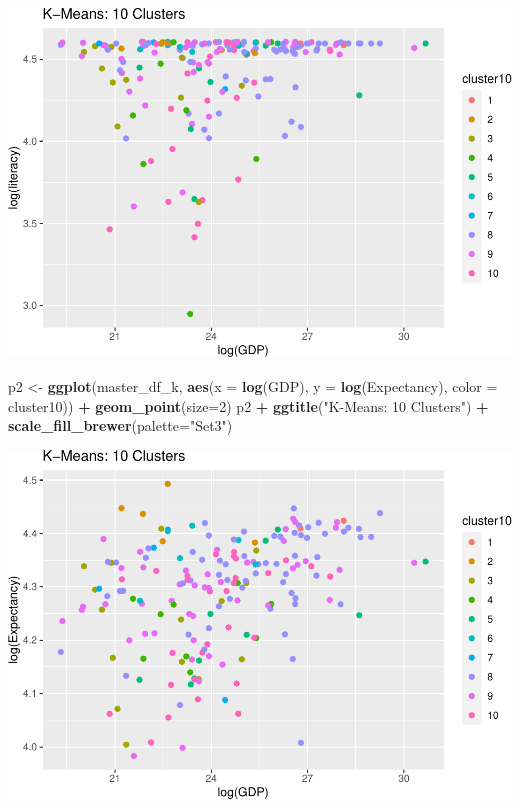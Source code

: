 \documentclass[]{article}
\newenvironment{Shaded}{\begin{snugshade}}{\end{snugshade}}
\newcommand{\DataTypeTok}[1]{\textcolor[rgb]{0.13,0.29,0.53}{#1}}
\newcommand{\DecValTok}[1]{\textcolor[rgb]{0.00,0.00,0.81}{#1}}
\newcommand{\KeywordTok}[1]{\textcolor[rgb]{0.13,0.29,0.53}{\textbf{#1}}}
\newcommand{\NormalTok}[1]{#1}
\newcommand{\OperatorTok}[1]{\textcolor[rgb]{0.81,0.36,0.00}{\textbf{#1}}}
\newcommand{\StringTok}[1]{\textcolor[rgb]{0.31,0.60,0.02}{#1}}
\begin{document}
\includegraphics{eda_files/figure-latex/unnamed-chunk-29-4.pdf}

\begin{Shaded}
\begin{Highlighting}[]
\NormalTok{p2 <-}\StringTok{ }\KeywordTok{ggplot}\NormalTok{(master_df_k, }\KeywordTok{aes}\NormalTok{(}\DataTypeTok{x =} \KeywordTok{log}\NormalTok{(GDP), }\DataTypeTok{y =} \KeywordTok{log}\NormalTok{(Expectancy), }\DataTypeTok{color =}\NormalTok{ cluster10)) }\OperatorTok{+}
\StringTok{  }\KeywordTok{geom_point}\NormalTok{(}\DataTypeTok{size=}\DecValTok{2}\NormalTok{)}
\NormalTok{p2 }\OperatorTok{+}\StringTok{ }\KeywordTok{ggtitle}\NormalTok{(}\StringTok{"K-Means: 10 Clusters"}\NormalTok{) }\OperatorTok{+}\StringTok{ }\KeywordTok{scale_fill_brewer}\NormalTok{(}\DataTypeTok{palette=}\StringTok{"Set3"}\NormalTok{)}
\end{Highlighting}
\end{Shaded}

\includegraphics{eda_files/figure-latex/unnamed-chunk-29-5.pdf}
\end{document}

